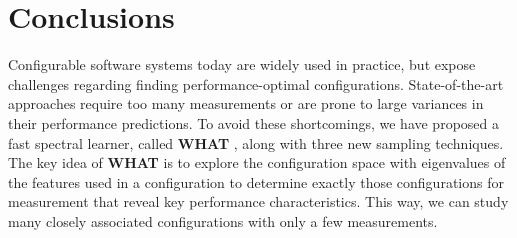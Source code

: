 \documentclass{newsig}
\newcommand{\tion}[1]{\S\ref{sect:#1}}
\newcommand{\what}{{\bf WHAT }}
\begin{document}
 




 



\section{Conclusions}

Configurable software systems today are widely used in practice, but expose challenges regarding finding performance-optimal configurations. State-of-the-art approaches require too many measurements or are prone to large variances in their performance predictions. To avoid these shortcomings, we have proposed a fast spectral learner, called \what,  along with three new sampling techniques. The key idea of \what is to explore the configuration space with eigenvalues of the features used in a configuration to determine exactly those configurations for measurement that reveal key performance characteristics. 
This way, we can study many closely associated configurations with only a few measurements.
\end{document}
